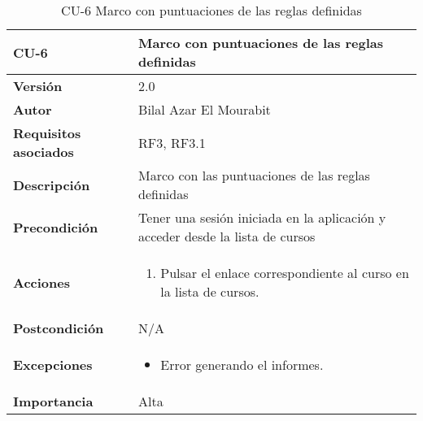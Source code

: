 \begin{table}[H]
	\centering
	\begin{tabularx}{\linewidth}{ p{} p{} }
		\toprule
		\textbf{CU-6}    & \textbf{Marco con puntuaciones de las reglas definidas}\\
		\toprule
		\textbf{Versión}              & 2.0   \\
		\textbf{Autor}                & Bilal Azar El Mourabit \\
		\textbf{Requisitos asociados} & RF3, RF3.1 \\
		\textbf{Descripción}          & Marco con las puntuaciones de las reglas definidas \\
    		\textbf{Precondición}         & Tener una sesión iniciada en la aplicación y acceder desde la lista de cursos  \\
		\textbf{Acciones}             & 
		\begin{enumerate}
			\def\labelenumi{\arabic{enumi}.}
			\tightlist
			\item Pulsar el enlace correspondiente al curso en la lista de cursos.
		\end{enumerate}\\
		\textbf{Postcondición}        & N/A \\
		\textbf{Excepciones}          & \begin{itemize}
		    \item Error generando el informes.
		\end{itemize} \\
		\textbf{Importancia}          & Alta \\
		\bottomrule
	\end{tabularx}
	\caption{CU-6 Marco con puntuaciones de las reglas definidas}
\end{table}

